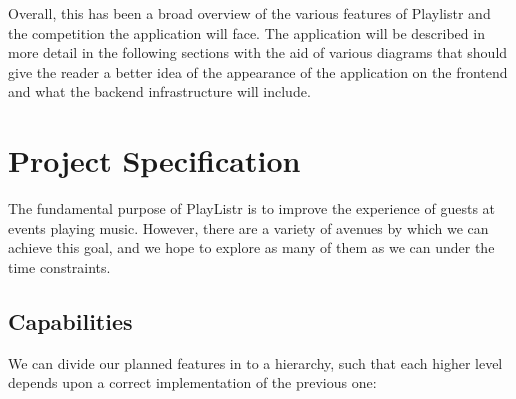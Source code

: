 \documentclass[12pt]{article}
\begin{document}
Overall, this has been a broad overview of the various features of
Playlistr and the competition the application will face. The
application will be described in more detail in the following sections
with the aid of various diagrams that should give the reader a better
idea of the appearance of the application on the frontend and what the
backend infrastructure will include.



\pagebreak

\section{Project Specification}
The fundamental purpose of PlayListr is to improve the experience of
guests at events playing music. However, there are a variety of
avenues by which we can achieve this goal, and we hope to explore as
many of them as we can under the time constraints.

\subsection{Capabilities}
We can divide our planned features in to a hierarchy, such that each
higher level depends upon a correct implementation of the previous
one:
\end{document}
